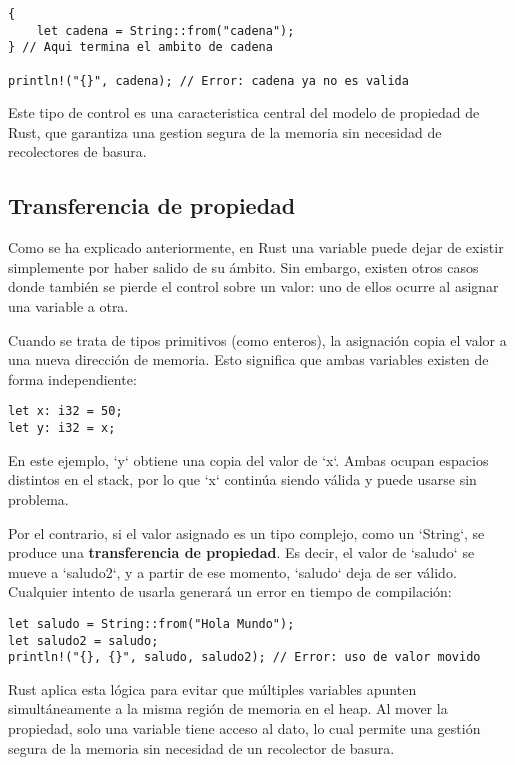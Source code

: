 \documentclass[12pt]{article}
\begin{document}
\begin{lstlisting}[style=ruststyle]
{
	let cadena = String::from("cadena");
} // Aqui termina el ambito de cadena

println!("{}", cadena); // Error: cadena ya no es valida
\end{lstlisting}

Este tipo de control es una caracteristica central del modelo de propiedad de Rust, que garantiza una gestion segura de la memoria sin necesidad de recolectores de basura.

\subsection{Transferencia de propiedad}

Como se ha explicado anteriormente, en Rust una variable puede dejar de existir simplemente por haber salido de su ámbito. Sin embargo, existen otros casos donde también se pierde el control sobre un valor: uno de ellos ocurre al asignar una variable a otra.

Cuando se trata de tipos primitivos (como enteros), la asignación copia el valor a una nueva dirección de memoria. Esto significa que ambas variables existen de forma independiente:

\begin{lstlisting}[style=ruststyle]
let x: i32 = 50;
let y: i32 = x;
\end{lstlisting}

En este ejemplo, `y` obtiene una copia del valor de `x`. Ambas ocupan espacios distintos en el stack, por lo que `x` continúa siendo válida y puede usarse sin problema.

Por el contrario, si el valor asignado es un tipo complejo, como un `String`, se produce una \textbf{transferencia de propiedad}. Es decir, el valor de `saludo` se mueve a `saludo2`, y a partir de ese momento, `saludo` deja de ser válido. Cualquier intento de usarla generará un error en tiempo de compilación:

\begin{lstlisting}[style=ruststyle]
let saludo = String::from("Hola Mundo");
let saludo2 = saludo;
println!("{}, {}", saludo, saludo2); // Error: uso de valor movido
\end{lstlisting}

Rust aplica esta lógica para evitar que múltiples variables apunten simultáneamente a la misma región de memoria en el heap. Al mover la propiedad, solo una variable tiene acceso al dato, lo cual permite una gestión segura de la memoria sin necesidad de un recolector de basura.
\end{document}
